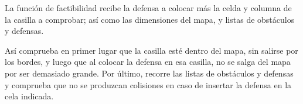 La función de factibilidad recibe la defensa a colocar más la celda y columna de la casilla a comprobar; así como las dimensiones del mapa, y listas de obstáculos y defensas.

Así comprueba en primer lugar que la casilla esté dentro del mapa, sin salirse por los bordes, y luego que al colocar la defensa en esa casilla, no se salga del mapa por ser demasiado grande. Por último, recorre las listas de obstáculos y defensas y comprueba que no se produzcan colisiones en caso de insertar la defensa en la cela indicada.
